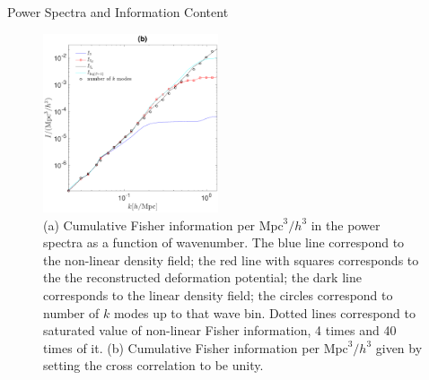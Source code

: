 \begin{section}{Power Spectra and Information Content}
\begin{figure}
  \includegraphics[width=0.46\textwidth]{fisher_best_analysis-crop.pdf}
\centering
   \caption{(a) Cumulative Fisher information per $\mathrm{Mpc}^3/h^3$ in the power spectra 
as a function of wavenumber. The blue line correspond to the non-linear density field; 
the red line with squares corresponds to the the reconstructed deformation 
potential; the dark line corresponds to the linear density field; the circles correspond to number 
of $k$ modes up to that wave bin. Dotted lines correspond to saturated value of 
non-linear Fisher information, 4 times and 40 times of it. (b) Cumulative Fisher information 
per $\mathrm{Mpc}^3/h^3$ given by setting the cross correlation to be unity.}
  \label{fig:fisherinfo}

\end{figure}

\end{section}
